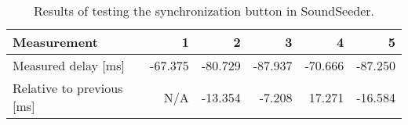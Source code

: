 \begin{table}[h]
\centering
\begin{tabular}{|l|r|r|r|r|r|}
\hline
Measurement          		& 1       & 2       & 3       & 4       & 5       \\ \hline
Measured delay [ms]       	& -67.375 & -80.729 & -87.937 & -70.666 & -87.250 \\ \hline
Relative to previous [ms] 	& N/A     & -13.354 & -7.208  & 17.271  & -16.584  \\ \hline
\end{tabular}
\caption{Results of testing the synchronization button in SoundSeeder.}
\label{fig:soundseedersyncbutton}
\end{table}
